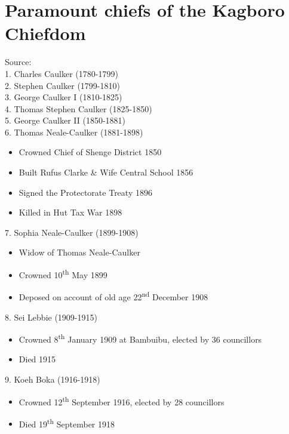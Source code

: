 \chapter{Paramount chiefs of the Kagboro Chiefdom}
\label{app:b}\label{bkm:Ref45374828}\hypertarget{Toc115517828}{}
Source: \citealt{Yanker2016}\\

1. Charles Caulker (1780-1799)\\
2. Stephen Caulker (1799-1810)\\
3. George Caulker I (1810-1825)\\
4. Thomas Stephen Caulker (1825-1850)\\
5. George Caulker II (1850-1881)\\
6. Thomas Neale-Caulker (1881-1898)
\begin{itemize}
\item Crowned Chief of Shenge  {District 1850}
\item Built Rufus Clarke \& Wife Central  {School 1856}
\item Signed the Protectorate Treaty 1896
\item Killed in Hut Tax War 1898
\end{itemize}

7. Sophia Neale-Caulker (1899-1908)
\begin{itemize}
\item Widow of Thomas Neale-Caulker
\item Crowned 10\textsuperscript{th}  {May 1899}
\item Deposed on account of old age 22\textsuperscript{nd}  {December 1908}
\end{itemize}

8. Sei Lebbie (1909-1915)
\begin{itemize}
\item Crowned 8\textsuperscript{th}  {January 1909} at Bambuibu, elected by 36 councillors
\item Died 1915
\end{itemize}

9. Koeh Boka (1916-1918)
\begin{itemize}
\item Crowned 12\textsuperscript{th}  {September 1916}, elected by 28 councillors
\item Died 19\textsuperscript{th}  {September 1918}
\end{itemize}

